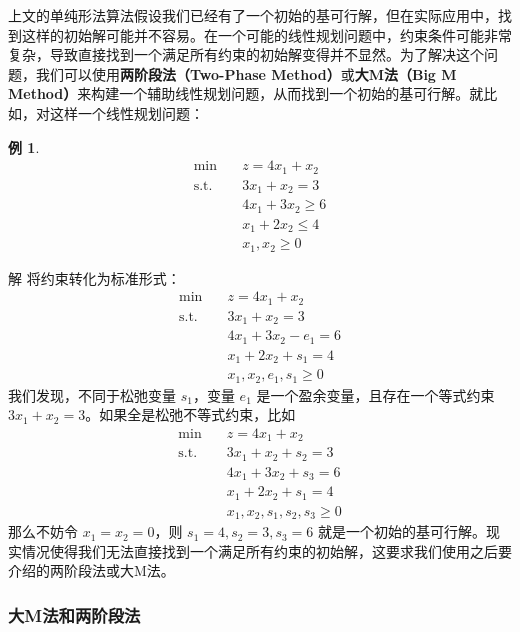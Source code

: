 \documentclass[12pt]{article}
\theoremstyle{plain}
\theoremstyle{definition}
\newtheorem{exm}{例}[subsection]
\newenvironment{slv}[1][解]{\begin{paragraph}{#1}\mbox{}}{\end{paragraph}\par\nopagebreak}
\newcommand{\st}{\mathrel{\text{s.t.}}}
\begin{document}
上文的单纯形法算法假设我们已经有了一个初始的基可行解，但在实际应用中，找到这样的初始解可能并不容易。在一个可能的线性规划问题中，约束条件可能非常复杂，导致直接找到一个满足所有约束的初始解变得并不显然。为了解决这个问题，我们可以使用\textbf{两阶段法（Two-Phase Method）}或\textbf{大M法（Big M Method）}来构建一个辅助线性规划问题，从而找到一个初始的基可行解。就比如，对这样一个线性规划问题：
\begin{exm}
    \begin{align*}
        \min \quad & z = 4x_1 + x_2 \\
        \st \quad & 3x_1 + x_2 = 3 \\
        & 4x_1 + 3x_2 \geq 6 \\
        & x_1 + 2x_2 \leq 4 \\
        & x_1, x_2 \geq 0
    \end{align*}
\end{exm}
\begin{slv}
    将约束转化为标准形式：
    \begin{align*}
        \min \quad & z = 4x_1 + x_2 \\
        \st \quad & 3x_1 + x_2= 3 \\
        & 4x_1 + 3x_2 - e_1 = 6 \\
        & x_1 + 2x_2 + s_1 = 4 \\
        & x_1, x_2, e_1, s_1 \geq 0
    \end{align*}
    我们发现，不同于松弛变量 $s_1$，变量 $e_1$ 是一个盈余变量，且存在一个等式约束 $3x_1 + x_2 = 3$。如果全是松弛不等式约束，比如
    \begin{align*}
        \min \quad & z = 4x_1 + x_2 \\
        \st \quad & 3x_1 + x_2 + s_2 = 3 \\
        & 4x_1 + 3x_2 + s_3 = 6 \\
        & x_1 + 2x_2 + s_1 = 4 \\
        & x_1, x_2, s_1, s_2, s_3 \geq 0
    \end{align*}
    那么不妨令 $x_1 = x_2 = 0$，则 $s_1 = 4, s_2 = 3, s_3 = 6$ 就是一个初始的基可行解。现实情况使得我们无法直接找到一个满足所有约束的初始解，这要求我们使用之后要介绍的两阶段法或大M法。
\end{slv}

\subsubsection{大M法和两阶段法}\label{subsubsec:big_m_two_phase}
\end{document}
